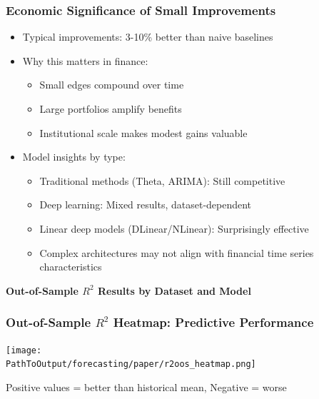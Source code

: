 \documentclass[ignorenonframetext, 9pt]{beamer}
\begin{document}
\begin{frame}
  \frametitle{Economic Significance of Small Improvements}
  \begin{itemize}
  \item Typical improvements: \alert{3-10\% better than naive baselines}
  \vspace{0.3cm}
  \item Why this matters in finance:
  \begin{itemize}
    \item Small edges compound over time
    \item Large portfolios amplify benefits
    \item Institutional scale makes modest gains valuable
  \end{itemize}
  \vspace{0.3cm}
  \item \alert{Model insights by type:}
  \begin{itemize}
    \item Traditional methods (Theta, ARIMA): Still competitive
    \item Deep learning: Mixed results, dataset-dependent
    \item Linear deep models (DLinear/NLinear): Surprisingly effective
    \item Complex architectures may not align with financial time series characteristics
  \end{itemize}
  \end{itemize}
\end{frame}



\begin{frame}[plain]
    \tiny
    \vspace{-0.5cm}
    \centering
    \textbf{Out-of-Sample $R^2$ Results by Dataset and Model}\\
    \vspace{0.2cm}
    
\end{frame}

\begin{frame}
  \frametitle{Out-of-Sample $R^2$ Heatmap: Predictive Performance}
  \centering
  \texttt{[image: \\PathToOutput/forecasting/paper/r2oos\_heatmap.png]}
  \vspace{0.2cm}

  Positive values = better than historical mean, Negative = worse
\end{frame}
\end{document}

